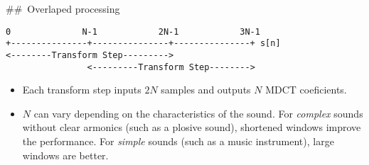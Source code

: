     \#\#~Overlaped processing

\begin{verbatim}
0              N-1            2N-1            3N-1
+---------------+---------------+---------------+ s[n]
<--------Transform Step--------->
                <---------Transform Step-------->
\end{verbatim}

\begin{itemize}
\item
  Each transform step inputs \(2N\) samples and outputs \(N\) MDCT
  coeficients.
\item
  \(N\) can vary depending on the characteristics of the sound. For
  \emph{complex} sounds without clear armonics (such as a plosive
  sound), shortened windows improve the performance. For \emph{simple}
  sounds (such as a music instrument), large windows are better.
\end{itemize}
